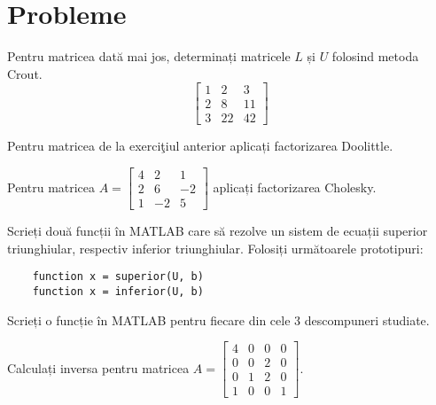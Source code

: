 \documentclass{exam}
\begin{document}
\section{Probleme}

\begin{questions}
	\boxedpoints
	\pointsinmargin

	\question Pentru matricea dată mai jos, determinați matricele $L$ și $U$
	folosind metoda Crout.
	\begin{equation*}
		\begin{bmatrix}
			1 & 2  & 3  \\
			2 & 8  & 11 \\
			3 & 22 & 42
		\end{bmatrix}
	\end{equation*}

	\question Pentru matricea de la exerciţiul anterior aplicați factorizarea
	Doolittle.

	\question Pentru matricea $A = \begin{bmatrix} 4 & 2 & 1 \\ 2 & 6 & -2 \\ 1 & -2 & 5 \end{bmatrix}$
	aplicați factorizarea Cholesky.

	\question Scrieți două funcții în MATLAB care să rezolve un sistem de
	ecuații superior triunghiular, respectiv inferior triunghiular. Folosiți
	următoarele prototipuri:
	\begin{verbatim}
	function x = superior(U, b)
	function x = inferior(U, b)
	\end{verbatim}

	\question Scrieți o funcție în MATLAB pentru fiecare din cele 3 descompuneri
	studiate.

	\question Calculați inversa pentru matricea $A = \begin{bmatrix} 4 & 0 & 0 & 0 \\ 0 & 0 & 2 & 0 \\ 0 & 1 & 2 & 0 \\ 1 & 0 & 0 & 1 \end{bmatrix}$.

\end{questions}



\end{document}
